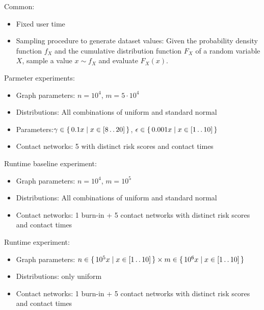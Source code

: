 Common:
\begin{itemize}
  \item Fixed user time
  \item Sampling procedure to generate dataset values: Given the probability density function $f_X$ and the cumulative distribution function $F_X$ of a random variable $X$, sample a value $x \sim f_X$ and evaluate $F_X(x)$.
\end{itemize}

Parmeter experiments:
\begin{itemize}
  \item Graph parameters: $n = 10^4$, $m = 5 \cdot 10^4$
  \item Distributions: All combinations of uniform and standard normal
  \item Parameters:$\gamma \in \set{ 0.1x | x \in [8 \mathinner{\ldotp \ldotp} 20]}$, $\epsilon \in \set{ 0.001x | x \in [1 \mathinner{\ldotp \ldotp} 10]}$
  \item Contact networks: 5 with distinct risk scores and contact times
\end{itemize}

Runtime baseline experiment:
\begin{itemize}
  \item Graph parameters: $n = 10^4$, $m = 10^5$
  \item Distributions: All combinations of uniform and standard normal
  \item Contact networks: 1 burn-in + 5 contact networks with distinct risk scores and contact times
\end{itemize}

Runtime experiment:
\begin{itemize}
  \item Graph parameters: $n \in \set{ 10^5x | x \in [1 \mathinner{\ldotp \ldotp} 10]} \times m \in \set{ 10^6x | x \in [1 \mathinner{\ldotp \ldotp} 10]}$
  \item Distributions: only uniform
  \item Contact networks: 1 burn-in + 5 contact networks with distinct risk scores and contact times
\end{itemize}